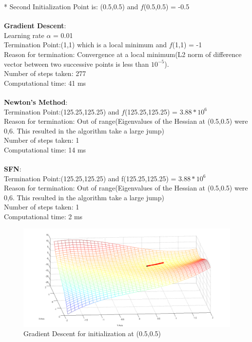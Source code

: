 * Second Initialization Point is: (0.5,0.5) and $f$(0.5,0.5) = -0.5
\\\\
\textbf{Gradient Descent}: 
\\Learning rate $\alpha$ = 0.01
\\Termination Point:(1,1) which is a local minimum and $f$(1,1) = -1
\\Reason for termination: Convergence at a local minimum(L2 norm of difference vector between two successive points is less than $10^{-5}$).
\\Number of steps taken: 277
\\Computational time: 41 ms
\\\\
\textbf{Newton’s Method}: 
\\Termination Point:(125.25,125.25) and $f$(125.25,125.25) = $3.88*10^6$
\\Reason for termination: Out of range(Eigenvalues of the Hessian at (0.5,0.5) were 0,6. This resulted in the algorithm take a large jump)
\\Number of steps taken: 1
\\Computational time: 14 ms
\\\\
\textbf{SFN}: 
\\Termination Point:(125.25,125.25) and f(125.25,125.25) = $3.88*10^6$
\\Reason for termination: Out of range(Eigenvalues of the Hessian at (0.5,0.5) were 0,6. This resulted in the algorithm take a large jump)
\\Number of steps taken: 1
\\Computational time: 2 ms

\begin{figure}[H]
\includegraphics[scale = 0.40]{62.png}
\caption{Gradient Descent for initialization at (0.5,0.5)}
\end{figure}

